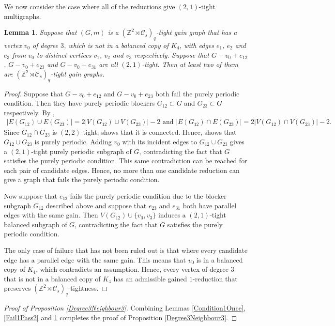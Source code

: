 \documentclass[reqno,a4paper,10pt]{article}
\newtheorem{lemma}[theorem]{Lemma}
\theoremstyle{definition}
\theoremstyle{remark}
\numberwithin{equation}{section}
\numberwithin{figure}{section}
\numberwithin{table}{section}
\newcommand{\Z}{\mathbb{Z}}
\begin{document}
    We now consider the case where all of the reductions give $(2,1)$-tight multigraphs.
    \begin{lemma}\label{Reflective6}
		Suppose that $(G,m)$ is a $(\Z^2\rtimes\mathcal{C}_s)_q$-tight gain graph that has a vertex $v_0$ of degree $3$, which is not in a balanced copy of $K_4$, with edges $e_1$, $e_2$ and $e_3$ from $v_0$ to distinct vertices $v_1$, $v_2$ and $v_3$ respectively. Suppose that $G-v_0+e_{12}$, $G-v_0+e_{23}$ and $G-v_0+e_{31}$ are all $(2,1)$-tight. Then at least two of them are $(\Z^2\rtimes\mathcal{C}_s)_q$-tight gain graphs.
	\end{lemma}
    \begin{proof}
		Suppose that $G-v_0+e_{12}$ and $G-v_0+e_{23}$ both fail the purely periodic condition. Then they have purely periodic blockers $G_{12}\subset G$ and $G_{23}\subset G$ respectively. By \cite[Lemma 5.17]{EssonCrystallographic},
        \begin{align*}
            |E(G_{12})\cup E(G_{23})|=2|V(G_{12})\cup V(G_{23})|-2\text{ and }|E(G_{12})\cap E(G_{23})|=2|V(G_{12})\cap V(G_{23})|-2.
        \end{align*}
        Since $G_{12}\cap G_{23}$ is $(2,2)$-tight, \cite[Theorem 5]{Pebble} shows that it is connected. Hence, \cite[Lemma 5.20]{EssonCrystallographic} shows that $G_{12}\cup G_{23}$ is purely periodic. Adding $v_0$ with its incident edges to $G_{12}\cup G_{23}$ gives a $(2,1)$-tight purely periodic subgraph of $G$, contradicting the fact that $G$ satisfies the purely periodic condition. This same contradiction can be reached for each pair of candidate edges. Hence, no more than one candidate reduction can give a graph that fails the purely periodic condition.
		
		Now suppose that $e_{12}$ fails the purely periodic condition due to the blocker subgraph $G_{12}$ described above and suppose that $e_{23}$ and $e_{31}$ both have parallel edges with the same gain. Then $V(G_{12})\cup\{v_0,v_3\}$ induces a $(2,1)$-tight balanced subgraph of $G$, contradicting the fact that $G$ satisfies the purely periodic condition.
		
		The only case of failure that has not been ruled out is that where every candidate edge has a parallel edge with the same gain. This means that $v_0$ is in a balanced copy of $K_4$, which contradicts an assumption. Hence, every vertex of degree $3$ that is not in a balanced copy of $K_4$ has an admissible gained $1$-reduction that preserves $(\Z^2\rtimes\mathcal{C}_s)_q$-tightness.
	\end{proof}
    \begin{proof}[Proof of Proposition \ref{Degree3Neighbour3}]
        Combining Lemmas \ref{Condition1Once}, \ref{Fail1Pass2} and \ref{Reflective6} completes the proof of Proposition \ref{Degree3Neighbour3}.
    \end{proof}
\end{document}
